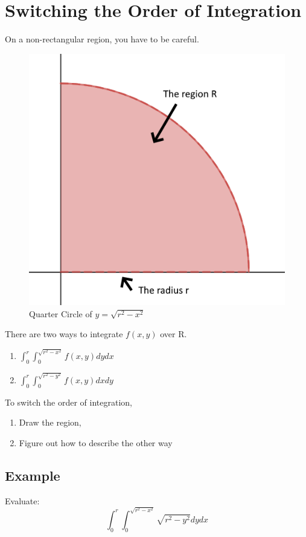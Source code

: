 \documentclass{article}
\begin{document}
\section{Switching the Order of Integration}
On a non-rectangular region, you have to be careful.
\begin{figure}[h!]
    \centering
    \includegraphics[scale=.5]{quarterCircle.png}

    \caption{Quarter Circle of $y=\sqrt{r^2-x^2}$}
    \label{}
\end{figure}
There are two ways to integrate $f(x,y)$ over R.
\begin{enumerate}
    \item $\int^r_0 \int^{\sqrt{r^2-x^2}}_0 f(x,y) dydx$
    \item $\int^r_0 \int^{\sqrt{r^2-y^2}}_0 f(x,y) dxdy$
\end{enumerate}

To switch the order of integration,
\begin{enumerate}
    \item Draw the region,
    \item Figure out how to describe the other way
\end{enumerate}

\subsection*{Example}
Evaluate:
\[\int^r_0\int^{\sqrt{r^2-x^2}}_0 \sqrt{r^2-y^2}dydx\]
\end{document}
